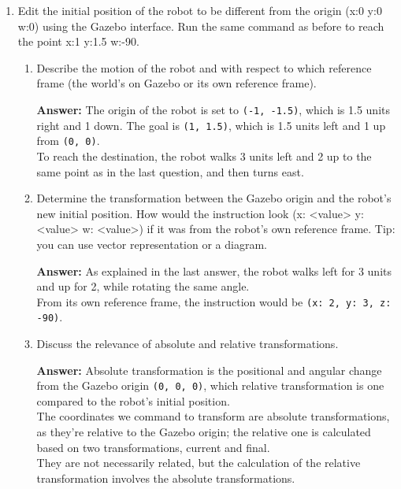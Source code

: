 \documentclass[12pt]{article}
\begin{document}
\begin{enumerate}
\begin{enumerate}
      \item Edit the initial position of the robot to be different from the origin (x:0 y:0 w:0) using the Gazebo interface. Run the same command as before to reach the point x:1 y:1.5 w:-90.
      
      \begin{enumerate}
          \item Describe the motion of the robot and with respect to which reference frame (the world’s on Gazebo or its own reference frame).
          
          \textbf{Answer: }The origin of the robot is set to \texttt{(-1, -1.5)}, which is 1.5 units right and 1 down. The goal is \texttt{(1, 1.5)}, which is 1.5 units left and 1 up from \texttt{(0, 0)}.
          \\To reach the destination, the robot walks 3 units left and 2 up to the same point as in the last question, and then turns east.

          \item Determine the transformation between the Gazebo origin and the robot’s new initial position. How would the instruction look (x: <value> y: <value> w: <value>) if it was from the robot’s own reference frame.
          Tip: you can use vector representation or a diagram.

          \textbf{Answer: }As explained in the last answer, the robot walks left for 3 units and up for 2, while rotating the same angle.
          \\From its own reference frame, the instruction would be \texttt{(x: 2, y: 3, z: -90)}.

          \item Discuss the relevance of absolute and relative transformations.
          
          \textbf{Answer: }Absolute transformation is the positional and angular change from the Gazebo origin \texttt{(0, 0, 0)}, which relative transformation is one compared to the robot's initial position.
          \\The coordinates we command to transform are absolute transformations, as they're relative to the Gazebo origin; the relative one is calculated based on two transformations, current and final.
          \\They are not necessarily related, but the calculation of the relative transformation involves the absolute transformations.

      \end{enumerate}


\end{enumerate}
\end{enumerate}
\end{document}
